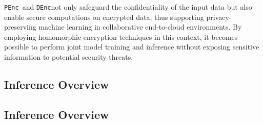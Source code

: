 \documentclass[conference]{IEEEtran}
\newcommand{\DEnc}{\texttt{DEnc}}
\newcommand{\PEnc}{\texttt{PEnc}}
\begin{document}
\PEnc~and \DEnc not only safeguard the confidentiality of the input data but also enable secure computations on encrypted data, thus supporting privacy-preserving machine learning in collaborative end-to-cloud environments. By employing homomorphic encryption techniques in this context, it becomes possible to perform joint model training and inference without exposing sensitive information to potential security threats.




\subsection{Inference Overview}

\subsection{Inference Overview}
\end{document}
